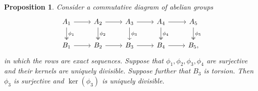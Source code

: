 \documentclass[11pt, oneside, dvipsnames, svgnames, table, final]{amsart}
\theoremstyle{plain}
\newtheorem{proposition}[thm]{Proposition}
\theoremstyle{definition}
\theoremstyle{remark}
\newcommand{\<}[1]{{\langle}#1 {\rangle}}
\begin{document}
\begin{proposition}\label{pr:5lemmaDiv}
  Consider a commutative diagram of abelian groups
  \begin{equation}\label{eq:5lemma}
    \begin{tikzcd}
      A_1 \arrow[d,two heads,"\phi_1"] \rar & A_2 \arrow[d,two heads,"\phi_2"] \rar & A_3 \arrow[d,"\phi_3"] \rar & A_4 \arrow[d,two heads,"\phi_4"] \rar & A_5 \arrow[d,two heads,"\phi_5"] \\
      B_1 \rar & B_2 \rar & B_3 \rar & B_4 \rar & B_5,
    \end{tikzcd}
  \end{equation}
  in which the rows are exact sequences.
  Suppose that $\phi_1, \phi_2, \phi_3, \phi_4$ are surjective and their kernels are uniquely divisible. Suppose further that $B_3$ is torsion. Then $\phi_3$ is surjective and $\ker(\phi_3)$ is uniquely divisible.
\end{proposition}
\end{document}
